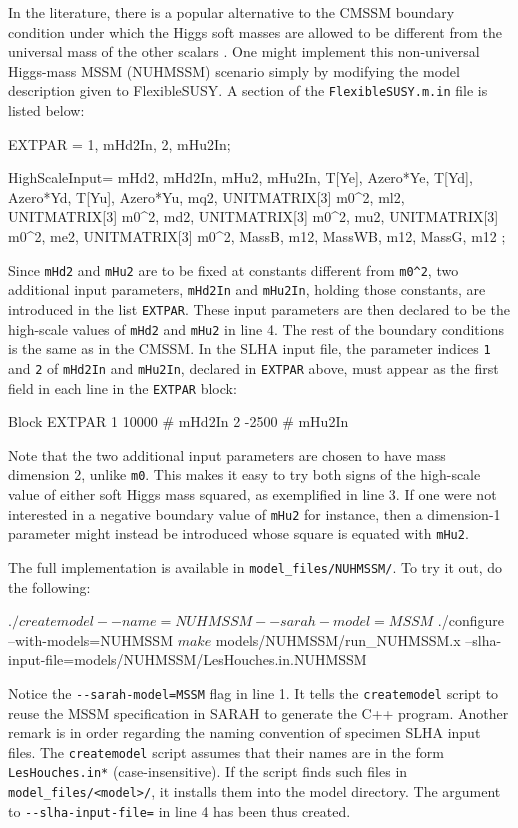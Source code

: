 \documentclass[final,3p,11pt,pdflatex]{elsarticle}
\makeatletter
\newcommand{\sarah}{SARAH\@\xspace}
\newcommand{\fs}{FlexibleSUSY\@\xspace}
\newcommand{\code}[1]{\lstinline|#1|}  %
\makeatother
\begin{document}
In the literature,
there is a popular alternative to the CMSSM boundary condition
under which the Higgs soft masses are allowed to be different from
the universal mass of the other scalars \cite{NUHM}.
One might implement
this non-universal Higgs-mass MSSM (NUHMSSM) scenario
simply by modifying the model description given to \fs.
A section of the \code{FlexibleSUSY.m.in} file is listed below:
\begin{numlstlisting}
EXTPAR = {{1, mHd2In}, {2, mHu2In}};

HighScaleInput={
  {mHd2, mHd2In}, {mHu2, mHu2In},
  {T[Ye], Azero*Ye}, {T[Yd], Azero*Yd}, {T[Yu], Azero*Yu},
  {mq2, UNITMATRIX[3] m0^2}, {ml2, UNITMATRIX[3] m0^2}, {md2, UNITMATRIX[3] m0^2},
  {mu2, UNITMATRIX[3] m0^2}, {me2, UNITMATRIX[3] m0^2},
  {MassB, m12}, {MassWB, m12}, {MassG, m12}
};
\end{numlstlisting}
Since \code{mHd2} and \code{mHu2} are to be fixed at constants
different from \code{m0^2},
two additional input parameters,
\code{mHd2In} and \code{mHu2In}, holding those constants,
are introduced in the list \code{EXTPAR}.
These input parameters are then declared to be the high-scale values of
\code{mHd2} and \code{mHu2} in line 4.
The rest of the boundary conditions is the same as in the CMSSM\@.
In the SLHA input file,
the parameter indices \code{1} and \code{2} of
\code{mHd2In} and \code{mHu2In}, declared in \code{EXTPAR} above,
must appear
as the first field in each line in the \code{EXTPAR} block:
\begin{numlstlisting}
Block EXTPAR
    1   10000                # mHd2In
    2   -2500                # mHu2In
\end{numlstlisting}
Note that the two additional input parameters are chosen to have
mass dimension 2, unlike \code{m0}.
This makes it easy to
try both signs of the high-scale value of either soft Higgs mass squared,
as exemplified in line 3.
If one were not interested in a negative boundary value of \code{mHu2}
for instance,
then a dimension-1 parameter %
might instead be introduced whose square is equated with \code{mHu2}.

The full implementation is available
in \code{model_files/NUHMSSM/}.
To try it out, do the following:
\begin{numlstlisting}[language=bash]
$ ./createmodel --name=NUHMSSM --sarah-model=MSSM
$ ./configure --with-models=NUHMSSM
$ make
$ models/NUHMSSM/run_NUHMSSM.x --slha-input-file=models/NUHMSSM/LesHouches.in.NUHMSSM
\end{numlstlisting}
Notice the \code{--sarah-model=MSSM} flag in line 1.
It tells the \code{createmodel} script to reuse
the MSSM specification in \sarah
to generate the C++ program.
Another remark is in order regarding the naming convention
of specimen SLHA input files.  The \code{createmodel} script assumes
that their names are in the form \code{LesHouches.in*} (case-insensitive).
If the script finds such files in \code{model_files/<model>/},
it installs them into the model directory.  The argument to
\code{--slha-input-file=} in line 4 has been thus created.
\end{document}
